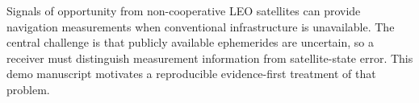 Signals of opportunity from non-cooperative LEO satellites can provide navigation measurements when conventional infrastructure is unavailable. The central challenge is that publicly available ephemerides are uncertain, so a receiver must distinguish measurement information from satellite-state error. This demo manuscript motivates a reproducible evidence-first treatment of that problem.
